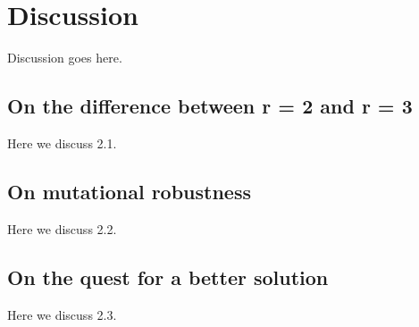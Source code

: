 \section{Discussion} \label{discussion}

Discussion goes here.

\subsection{On the difference between r = 2 and r = 3}

Here we discuss 2.1.

\subsection{On mutational robustness}

Here we discuss 2.2.

\subsection{On the quest for a better solution}

Here we discuss 2.3.


